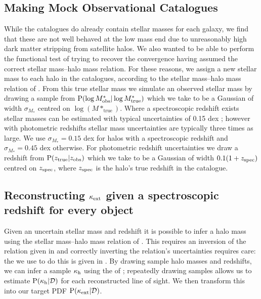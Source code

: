 \documentclass[useAMS,usenatbib]{mn2e}
\begin{document}
\subsection{Making Mock Observational Catalogues}

While the \MS catalogues do already contain stellar masses for each galaxy, we
find that these are not well behaved at the low mass end due to unreasonably high dark matter stripping from satellite halos. We also wanted to be able to perform the functional test of
trying to recover the convergence having assumed the correct stellar
mass--halo mass relation. For these reasons, we assign a new stellar mass to
each halo in the \MS catalogues, according to the stellar mass--halo mass
relation of \citet{BehrooziEtal2010}. From this true  stellar mass we
simulate an observed stellar mass by drawing a sample from 
${\rm P}(\log{M^{*}_{\rm obs}}|\log{M^{*}_{\rm true}})$ which we take to be a
Gaussian of width $\sigma_{M_*}$ centred on $\log(M*_{\mathrm {true}})$. Where
a spectroscopic redshift exists stellar masses can be estimated with typical
uncertainties of 0.15 dex \citep{AugerEtal2009}; however with photometric
redshifts stellar mass uncertainties are typically three times as large. We
use $\sigma_{M_*}=0.15$ dex for halos with a spectroscopic redshift and
$\sigma_{M_*}=0.45$ dex otherwise. For photometric redshift uncertainties we draw a
redshift from ${\rm P}(z_{\rm true}|z_{\rm obs})$ which we take to be a Gaussian
of width $0.1(1+z_{\rm spec})$ centred on $z_{\rm spec}$, where $z_{\rm spec}$
is the halo's true redshift in the \MS catalogue.


\subsection{Reconstructing $\kappa_{\rm ext}$ given a spectroscopic redshift for every object}

Given an uncertain stellar mass and redshift it is possible to infer a
halo mass using the stellar mass--halo mass relation of
\citet{BehrooziEtal2010}. This \proceedure requires an inversion of the
relation given in \citet{BehrooziEtal2010} and correctly inverting the
relation's uncertainties requires care: the \proceedure we use to do this
is given in . By drawing sample halo masses
and redshifts, we can infer a sample $\kappa_{\rm h}$ using the \proceedure of
; repeatedly drawing samples allows us to
estimate ${\rm P}(\kappa_{\rm h}|{\mathcal{D}})$ for each reconstructed line of sight. We then
transform this into our target PDF ${\rm P}(\kappa_{\rm ext}|{\mathcal{D}})$.
\end{document}
